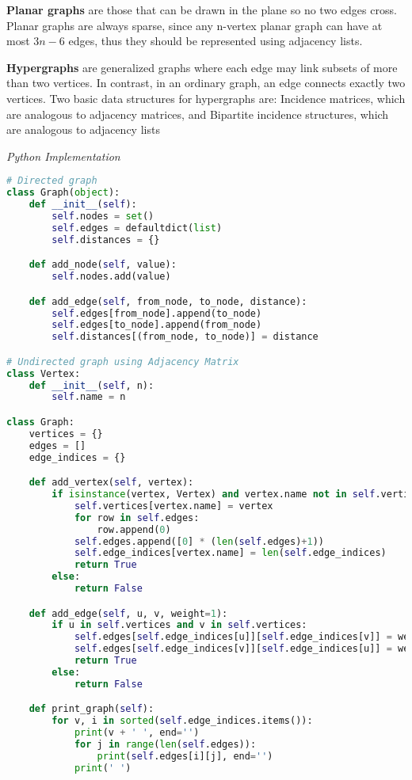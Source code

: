 \documentclass{article}
\begin{document}
    \textbf{Planar graphs} are those that can be drawn in the plane so no two edges cross. Planar graphs are always sparse, since any n-vertex planar graph can have at most $3n - 6$ edges, thus they should be represented using adjacency lists. 
    
    \textbf{Hypergraphs} are generalized graphs where each edge may link subsets of more than two vertices. In contrast, in an ordinary graph, an edge connects exactly two vertices. Two basic data structures for hypergraphs are: Incidence matrices, which are analogous to adjacency matrices, and Bipartite incidence structures, which are analogous to adjacency lists
    
\vspace{8pt} \emph{Python Implementation}
\begin{lstlisting}[language=Python]
# Directed graph 
class Graph(object):
    def __init__(self):
        self.nodes = set()
        self.edges = defaultdict(list)
        self.distances = {}

    def add_node(self, value):
        self.nodes.add(value)

    def add_edge(self, from_node, to_node, distance):
        self.edges[from_node].append(to_node)
        self.edges[to_node].append(from_node)
        self.distances[(from_node, to_node)] = distance

# Undirected graph using Adjacency Matrix
class Vertex:
    def __init__(self, n):
        self.name = n

class Graph:
    vertices = {}
    edges = []
    edge_indices = {}

    def add_vertex(self, vertex):
        if isinstance(vertex, Vertex) and vertex.name not in self.vertices:
            self.vertices[vertex.name] = vertex
            for row in self.edges:
                row.append(0)
            self.edges.append([0] * (len(self.edges)+1))
            self.edge_indices[vertex.name] = len(self.edge_indices)
            return True
        else:
            return False

    def add_edge(self, u, v, weight=1):
        if u in self.vertices and v in self.vertices:
            self.edges[self.edge_indices[u]][self.edge_indices[v]] = weight
            self.edges[self.edge_indices[v]][self.edge_indices[u]] = weight
            return True
        else:
            return False

    def print_graph(self):
        for v, i in sorted(self.edge_indices.items()):
            print(v + ' ', end='')
            for j in range(len(self.edges)):
                print(self.edges[i][j], end='')
            print(' ')


\end{lstlisting}
\end{document}
